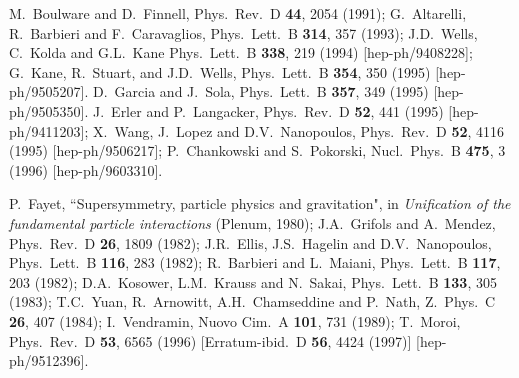 \documentclass[12pt]{article}
\begin{document}
\begin{thebibliography}{999}
M.~Boulware and D.~Finnell, 
  Phys.\ Rev.\ D {\bf 44}, 2054 (1991);
G.~Altarelli, R.~Barbieri and F.~Caravaglios,
  Phys.\ Lett.\ B {\bf 314}, 357 (1993);
J.D.~Wells, C.~Kolda and G.L.~Kane 
  Phys.\ Lett.\ B {\bf 338}, 219 (1994)
  [hep-ph/9408228];
G.~Kane, R.~Stuart, and J.D.~Wells, 
  Phys.\ Lett.\ B {\bf 354}, 350 (1995)
  [hep-ph/9505207].
D.~Garcia and J.~Sola, 
  Phys.\ Lett.\ B {\bf 357}, 349 (1995)
  [hep-ph/9505350].
J.~Erler and P.~Langacker, 
  Phys.\ Rev.\ D {\bf 52}, 441 (1995)
  [hep-ph/9411203];
X.~Wang, J.~Lopez and D.V.~Nanopoulos,
  Phys.\ Rev.\ D {\bf 52}, 4116 (1995)
  [hep-ph/9506217];
P.~Chankowski and S.~Pokorski, 
  Nucl.\ Phys.\ B {\bf 475}, 3 (1996)
  [hep-ph/9603310].
  
P.~Fayet, ``Supersymmetry, particle physics and gravitation", 
  in {\em Unification of the fundamental
  particle interactions} (Plenum, 1980);
J.A.~Grifols and A.~Mendez,
  Phys.\ Rev.\ D {\bf 26}, 1809 (1982);
J.R.~Ellis, J.S.~Hagelin and D.V.~Nanopoulos,
  Phys.\ Lett.\ B {\bf 116}, 283 (1982);
R.~Barbieri and L.~Maiani,
  Phys.\ Lett.\ B {\bf 117}, 203 (1982);
D.A.~Kosower, L.M.~Krauss and N.~Sakai,
  Phys.\ Lett.\ B {\bf 133}, 305 (1983);
T.C.~Yuan, R.~Arnowitt, A.H.~Chamseddine and P.~Nath,
  Z.\ Phys.\ C {\bf 26}, 407 (1984);
I.~Vendramin,
  Nuovo Cim.\ A {\bf 101}, 731 (1989);
T.~Moroi,
  Phys.\ Rev.\ D {\bf 53}, 6565 (1996)
  [Erratum-ibid.\ D {\bf 56}, 4424 (1997)]
  [hep-ph/9512396].


\end{thebibliography}
\end{document}
